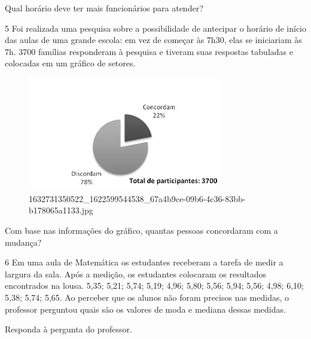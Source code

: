 {{{\begin{escolha}
{{{{\begin{escolha}
\begin{escolha}
{%

Qual horário deve ter mais funcionários para atender?



\num{5} Foi realizada uma pesquisa sobre a possibilidade de antecipar o horário
de início das aulas de uma grande escola: em vez de começar às 7h30, elas se iniciariam
às 7h. 3700 famílias responderam à pesquisa e tiveram suas respostas tabuladas e
colocadas em um gráfico de setores.

\begin{figure}
\centering
\includegraphics[width=3.34677in,height=1.96063in]{./_SAEB_9_MAT/media/image215.jpg}
\caption{1632731350522\_1622599544538\_67a4b9ce-09b6-4c36-83bb-b178065a1133.jpg}
\end{figure}


Com base nas informações do gráfico, quantas pessoas concordaram com a mudança?



\num{6} Em uma aula de Matemática os estudantes receberam a tarefa de medir a
largura da sala. Após a medição, os estudantes colocaram os resultados
encontrados na lousa. 5,35; 5,21; 5,74; 5,19; 4,96; 5,80; 5,56; 5,94; 5,56; 
4,98; 6,10; 5,38; 5,74; 5,65. Ao perceber que os alunos não foram precisos nas
medidas, o professor perguntou quais são os valores de moda e mediana dessas medidas.

Responda à pergunta do professor.


}
\end{escolha}
\end{escolha}}}}}
\end{escolha}}}}
